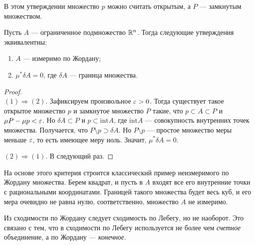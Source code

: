 \begin{Comment}
В этом утверждении множество $p$ можно считать открытым, а $P$ --- замкнутым множеством.
\end{Comment}

\begin{Statement}
Пусть $A$ --- ограниченное подмножество $\mathbb{R}^n$. Тогда следующие утверждения эквивалентны:
\begin{enumerate}
\item $A$ --- измеримо по Жордану;
\item $\mu^* \delta A = 0$, где $\delta A$ --- граница множества.
\end{enumerate}
\end{Statement}
\begin{proof}\ \\
$(1) \Rightarrow (2)$. Зафиксируем произвольное $\varepsilon > 0$. Тогда существует такое открытое множество $p$ и замкнутое множество $P$ такие, что $p \subset A \subset P$ и $\mu P- \mu p < \varepsilon$. Но $\delta A \subset P$ и $p \subset \mathrm{int} A$, где $\mathrm{int} A$ --- совокупность внутренних точек множества. Получается, что $P \setminus p \supset \delta A$. Но $P \setminus p$ --- простое множество меры меньше $\varepsilon$, то есть имеющее меру ноль. Значит, $\mu^* \delta A = 0$.

$(2) \Rightarrow (1)$. В следующий раз.
\end{proof}

\begin{Comment}
На основе этого критерия строится классический пример неизмеримого по Жордану множества. Берем квадрат, и пусть в $A$ входят все его внутренние точки с рациональными координатами. Границей такого множества будет весь куб, и его мера очевидно не равна нулю, соответственно, множество $A$ не измеримо.
\end{Comment}
\begin{Comment}
Из сходимости по Жордану следует сходимость по Лебегу, но не наоборот. Это связано с тем, что в сходимости по Лебегу используется не более чем \textit{счетное} объединение, а по Жордану --- \textit{конечное}.
\end{Comment}
